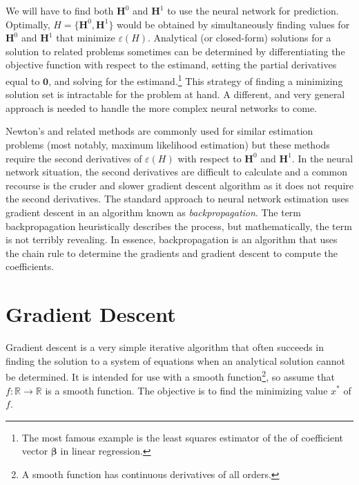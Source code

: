 \documentclass[graybox,envcountchap]{svmono}
\newcommand{\Hf}{\mathbf{H}}
\newcommand{\bef}{\boldsymbol{\beta}}
\newcommand{\nn}{neural network}
\begin{document}
We will have to find both  $\Hf^0$ and $\Hf^1$ to use the \nn { for} prediction.  Optimally, $H = \{\Hf^0,\Hf^1\}$ would be obtained by simultaneously finding values for $\Hf^0$ and $\Hf^1$ that  minimize $\varepsilon(H)$. Analytical (or closed-form) solutions  for a solution to related problems sometimes can be determined by differentiating the objective function  with respect to the estimand, setting the partial derivatives equal to $\boldsymbol{0}$, and solving for the estimand.\footnote{The most famous example is the least squares estimator of the of coefficient vector $\bef$ in linear regression.}  This strategy of finding a minimizing solution set is intractable for the problem at hand. A different, and very general approach is needed to handle the more complex {\nn }s to come.

Newton's and related methods are commonly used for similar estimation problems  (most notably, maximum likelihood estimation) but these methods  require the second derivatives of $\varepsilon(H)$ with respect to  $\Hf^0$ and $\Hf^1$.  In the \nn{ situation}, the second derivatives are difficult to calculate and a common recourse is the cruder and slower  gradient descent algorithm as it does not require the second derivatives. The standard approach to {\nn } estimation uses gradient descent in an algorithm known as \emph{backpropagation}. The term {backpropagation} heuristically describes the process, but mathematically, the term is not terribly revealing. In essence, backpropagation is an algorithm that uses the chain rule to determine the gradients and gradient descent to compute the coefficients.


\section{Gradient Descent}\label{section:gd}

Gradient descent is a very simple iterative algorithm that often succeeds in finding the solution to a system of equations when an analytical solution cannot be determined. It is intended for use with a smooth function\footnote{A smooth function has continuous derivatives of all orders.}, so assume that $f:\mathbb{R} \rightarrow \mathbb{R}$ is a smooth  function. The objective is to find the minimizing value $x^*$ of $f$. 
\end{document}
